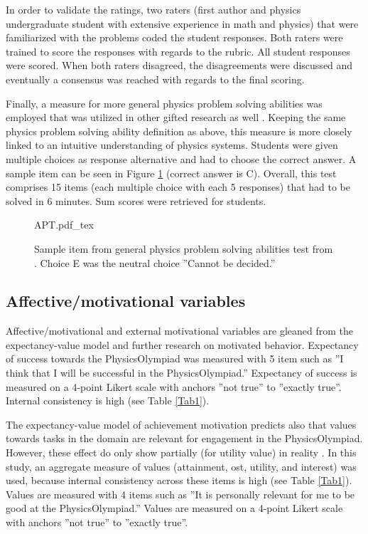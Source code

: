 \documentclass[]{interact}
\begin{document}
In order to validate the ratings, two raters (first author and physics undergraduate student with extensive experience in math and physics) that were familiarized with the problems coded the student responses. Both raters were trained to score the responses with regards to the rubric. All student responses were scored. When both raters disagreed, the disagreements were discussed and eventually a consensus was reached with regards to the final scoring.



Finally, a measure for more general physics problem solving abilities was employed that was utilized in other gifted research as well \cite{Heller.2007}. Keeping the same physics problem solving ability definition as above, this measure is more closely linked to an intuitive understanding of physics systems. Students were given multiple choices as response alternative and had to choose the correct answer. A sample item can be seen in Figure \ref{APT} (correct answer is C). Overall, this test comprises 15 items (each multiple choice with each 5 responses) that had to be solved in 6 minutes. Sum scores were retrieved for students.

\begin{figure}
\centering
{APT.pdf_tex}
\caption{Sample item from general physics problem solving abilities test from \cite{Heller.2007}. Choice E was the neutral choice ''Cannot be decided.''}
\label{APT}
\end{figure}

\subsection{Affective/motivational variables} 

Affective/motivational and external motivational variables are gleaned from the expectancy-value model and further research on motivated behavior. Expectancy of success towards the PhysicsOlympiad was measured with 5 item such as ''I think that I will be successful in the PhysicsOlympiad.'' Expectancy of success is measured on a 4-point Likert scale with anchors ''not true'' to ''exactly true''. Internal consistency is high (see Table \ref{Tab1}). 

The expectancy-value model of achievement motivation predicts also that values towards tasks in the domain are relevant for engagement in the PhysicsOlympiad. However, these effect do only show partially (for utility value) in reality \citep{Urhahne.2012}. In this study, an aggregate measure of values (attainment, ost, utility, and interest) was used, because internal consistency across these items is high (see Table \ref{Tab1}). Values are measured with 4 items such as ''It is personally relevant for me to be good at the PhysicsOlympiad.'' Values are measured on a 4-point Likert scale with anchors ''not true'' to ''exactly true''.
\end{document}
